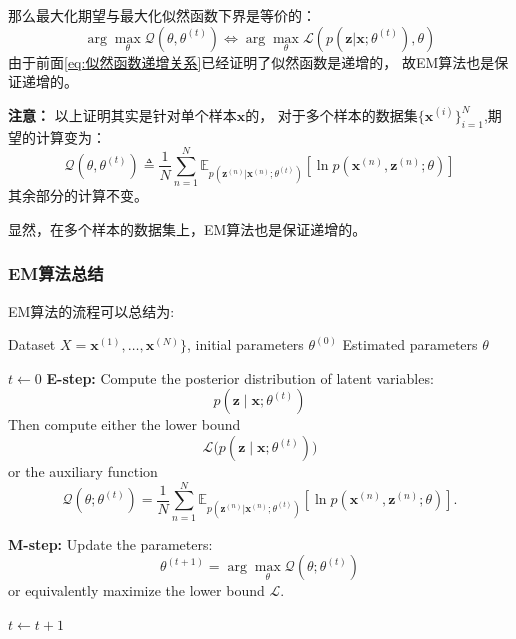 \documentclass[withoutpreface,bwprint]{NoteBook}
\begin{document}
那么最大化期望与最大化似然函数下界是等价的：
$$
\arg\max_\theta \mathcal{Q}(\theta,\theta^{(t)}) \Leftrightarrow \arg\max_\theta \mathcal{L}(p(\mathbf{z}|\mathbf{x};\theta^{(t)}),\theta)
$$
由于前面\cref{eq:似然函数递增关系}已经证明了似然函数是递增的，
故EM算法也是保证递增的。

\textbf{注意：} 
以上证明其实是针对单个样本$\mathbf{x}$的，
对于多个样本的数据集$\{ \mathbf{x}^{(i)} \}_{i=1}^N$,期望的计算变为：
\begin{equation}
    \label{eq:EM算法在多个样本数据集上的期望计算}
    \mathcal{Q}(\theta,\theta^{(t)}) \triangleq \frac{1}{N} \sum_{n=1}^{N} \mathbb{E}_{p(\mathbf{z}^{(n)}|\mathbf{x}^{(n)};\theta^{(t)})} \left[ \ln p(\mathbf{x}^{(n)},\mathbf{z}^{(n)};\theta)\right]
\end{equation}
其余部分的计算不变。

显然，在多个样本的数据集上，EM算法也是保证递增的。


\subsubsection{EM算法总结}
EM算法的流程可以总结为:
\begin{algorithm}[H]
    \caption{EM Algorithm}
    \begin{algorithmic}[1]
        \REQUIRE Dataset $X = \mathbf{x}^{(1)}, \ldots, \mathbf{x}^{(N)}\}$, initial parameters $\theta^{(0)}$
        \ENSURE Estimated parameters $\theta$
        
        \STATE $t \leftarrow 0$
        \REPEAT
            \STATE \textbf{E-step:} Compute the posterior distribution of latent variables:
            \[
                p(\mathbf{z} \mid \mathbf{x}; \theta^{(t)})
            \]
            Then compute either the lower bound
            \[
                \mathcal{L}\big(p(\mathbf{z}\mid \mathbf{x}; \theta^{(t)})\big)
            \]
            or the auxiliary function
            \[
                \mathcal{Q}(\theta; \theta^{(t)}) = 
                \frac{1}{N} \sum_{n=1}^{N} \mathbb{E}_{p(\mathbf{z}^{(n)}|\mathbf{x}^{(n)};\theta^{(t)})} \left[ \ln p(\mathbf{x}^{(n)},\mathbf{z}^{(n)};\theta)\right].
            \]

            \STATE \textbf{M-step:} Update the parameters:
            \[
                \theta^{(t+1)} = \arg\max_{\theta} \mathcal{Q}(\theta; \theta^{(t)})
            \]
            or equivalently maximize the lower bound $\mathcal{L}$.

            \STATE $t \leftarrow t + 1$
    \end{algorithmic}
\end{algorithm}
\end{document}
